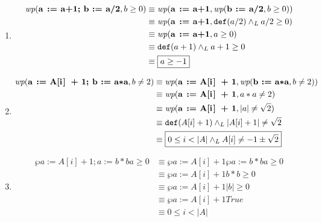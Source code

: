 \begin{enumerate}[label=\alph*)]
    \item \begin{align*}
              \wp{a := a+1; b := a/2}{b \geq 0} & \equiv \wp{a := a+1}{\wp{b := a/2}{b \geq 0}}      \\
                                                & \equiv \wp{a := a+1}{\Def{a/2} \yLuego a/2 \geq 0} \\
                                                & \equiv \wp{a := a+1}{a \geq 0}                     \\
                                                & \equiv \Def{a+1} \yLuego a+1 \geq 0                \\
                                                & \equiv \boxed{a \geq -1}
          \end{align*}

    \item \begin{align*}
              \wp{a := A[i] + 1; b := a*a}{b \neq 2} & \equiv \wp{a := A[i] + 1}{\wp{b := a*a}{b \neq 2}}              \\
                                                     & \equiv \wp{a := A[i] + 1}{a*a \neq 2}                           \\
                                                     & \equiv \wp{a := A[i] + 1}{|a| \neq \sqrt{2}}                    \\
                                                     & \equiv \Def{A[i] + 1} \yLuego |A[i] + 1| \neq \sqrt{2}          \\
                                                     & \equiv \boxed{0 \leq i < |A| \yLuego A[i] \neq -1 \pm \sqrt{2}}
          \end{align*}

    \item \begin{align*}
              \wp{a := A[i] + 1; a := b*b}{a \geq 0} & \equiv \wp{a := A[i] + 1}{\wp{a := b*b}{a \geq 0}} \\
                                                     & \equiv \wp{a := A[i] + 1}{b*b \geq 0}              \\
                                                     & \equiv \wp{a := A[i] + 1}{|b| \geq 0}              \\
                                                     & \equiv \wp{a := A[i] + 1}{True}                    \\
                                                     & \equiv \boxed{0 \leq i < |A|}
          \end{align*}


\end{enumerate}
